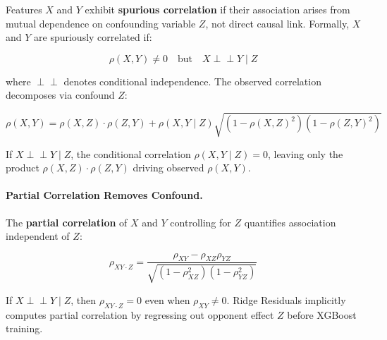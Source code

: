 Features $X$ and $Y$ exhibit \textbf{spurious correlation} if their association arises from mutual dependence on confounding variable $Z$, not direct causal link. Formally, $X$ and $Y$ are spuriously correlated if:

\begin{equation}
\rho(X, Y) \neq 0 \quad \text{but} \quad X \perp\!\!\!\perp Y \mid Z
\label{eq:spurious-correlation-def}
\end{equation}

where $\perp\!\!\!\perp$ denotes conditional independence. The observed correlation decomposes via confound $Z$:

\begin{equation}
\rho(X, Y) = \rho(X, Z) \cdot \rho(Z, Y) + \rho(X, Y \mid Z) \sqrt{(1 - \rho(X, Z)^2)(1 - \rho(Z, Y)^2)}
\label{eq:spurious-correlation-formula}
\end{equation}

If $X \perp\!\!\!\perp Y \mid Z$, the conditional correlation $\rho(X, Y \mid Z) = 0$, leaving only the product $\rho(X, Z) \cdot \rho(Z, Y)$ driving observed $\rho(X, Y)$.

\paragraph{Partial Correlation Removes Confound.}
The \textbf{partial correlation} of $X$ and $Y$ controlling for $Z$ quantifies association independent of $Z$:

\begin{equation}
\rho_{XY \cdot Z} = \frac{\rho_{XY} - \rho_{XZ} \rho_{YZ}}{\sqrt{(1 - \rho_{XZ}^2)(1 - \rho_{YZ}^2)}}
\label{eq:partial-correlation}
\end{equation}

If $X \perp\!\!\!\perp Y \mid Z$, then $\rho_{XY \cdot Z} = 0$ even when $\rho_{XY} \neq 0$. Ridge Residuals implicitly computes partial correlation by regressing out opponent effect $Z$ before XGBoost training.

